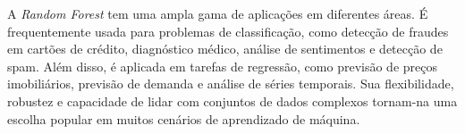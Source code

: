 \documentclass[12pt,oneside,a4paper,chapter=TITLE,
			   english,brazil]{abntex2}
\begin{document}
A \textit{Random Forest} tem uma ampla gama de aplicações em diferentes áreas. É frequentemente usada para problemas de classificação, como detecção de fraudes em cartões de crédito, diagnóstico médico, análise de sentimentos e detecção de spam. Além disso, é aplicada em tarefas de regressão, como previsão de preços imobiliários, previsão de demanda e análise de séries temporais. Sua flexibilidade, robustez e capacidade de lidar com conjuntos de dados complexos tornam-na uma escolha popular em muitos cenários de aprendizado de máquina.










\end{document}
